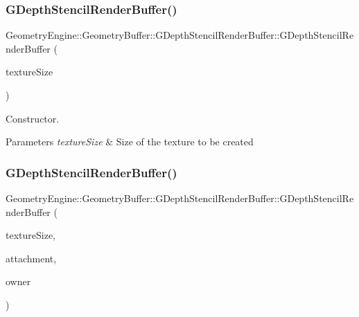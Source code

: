 \subsubsection{\texorpdfstring{GDepthStencilRenderBuffer()}{GDepthStencilRenderBuffer()}\hspace{0.1cm}{\footnotesize\ttfamily [1/3]}}
{\footnotesize\ttfamily Geometry\+Engine\+::\+Geometry\+Buffer\+::\+G\+Depth\+Stencil\+Render\+Buffer\+::\+G\+Depth\+Stencil\+Render\+Buffer (\begin{DoxyParamCaption}\item[{const Q\+Vector2D \&}]{texture\+Size }\end{DoxyParamCaption})}

Constructor. 
\begin{DoxyParams}{Parameters}
{\em texture\+Size} & Size of the texture to be created \\
\hline
\end{DoxyParams}
\mbox{\label{class_geometry_engine_1_1_geometry_buffer_1_1_g_depth_stencil_render_buffer_a27a3fc8842773b19247feb6fd25c32bd}} 
\subsubsection{\texorpdfstring{GDepthStencilRenderBuffer()}{GDepthStencilRenderBuffer()}\hspace{0.1cm}{\footnotesize\ttfamily [2/3]}}
{\footnotesize\ttfamily Geometry\+Engine\+::\+Geometry\+Buffer\+::\+G\+Depth\+Stencil\+Render\+Buffer\+::\+G\+Depth\+Stencil\+Render\+Buffer (\begin{DoxyParamCaption}\item[{const Q\+Vector2D \&}]{texture\+Size,  }\item[{G\+Framebuffer\+Commons\+::\+G\+\_\+\+D\+E\+P\+T\+H\+\_\+\+S\+T\+E\+N\+C\+I\+L\+\_\+\+A\+T\+T\+A\+C\+H\+M\+E\+N\+TS}]{attachment,  }\item[{const \mbox{\hyperlink{class_geometry_engine_1_1_geometry_buffer_1_1_g_framebuffer_object}{G\+Framebuffer\+Object}} $\ast$}]{owner }\end{DoxyParamCaption})}

